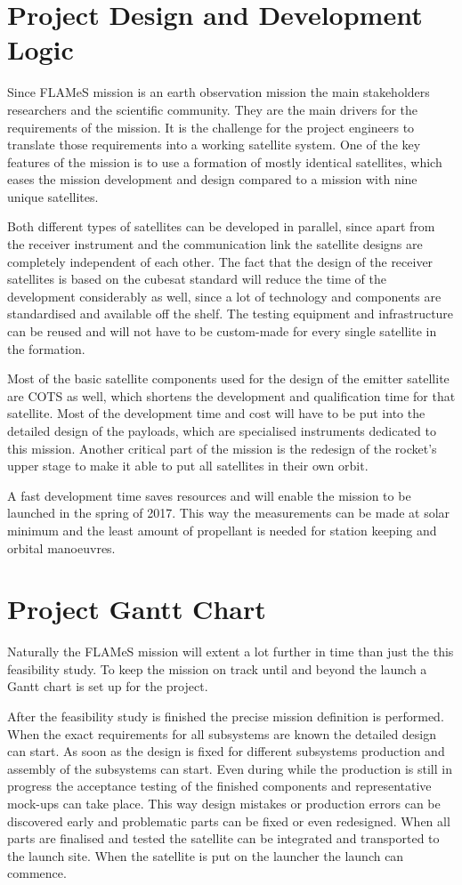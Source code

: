 \section{Project Design and Development Logic}
Since \ac{FLAMeS} mission is an earth observation mission the main stakeholders researchers and the scientific community. They are the main drivers for the requirements of the mission. It is the challenge for the project engineers to translate those requirements into a working satellite system. One of the key features of the mission is to use a formation of mostly identical satellites, which eases the mission development and design compared to a mission with nine unique satellites. 

Both different types of satellites can be developed in parallel, since apart from the receiver instrument and the communication link the satellite designs are completely independent of each other. The fact that the design of the receiver satellites is based on the cubesat standard will reduce the time of the development considerably as well, since a lot of technology and components are standardised and available off the shelf. The testing equipment and infrastructure can be reused and will not have to be custom-made for every single satellite in the formation. 

Most of the basic satellite components used for the design of the emitter satellite are \ac{COTS} as well, which shortens the development and qualification time for that satellite. Most of the development time and cost will have to be put into the detailed design of the payloads, which are specialised instruments dedicated to this mission. Another critical part of the mission is the redesign of the rocket's upper stage to make it able to put all satellites in their own orbit.

A fast development time saves resources and will enable the mission to be launched in the spring of 2017. This way the measurements can be made at solar minimum and the least amount of propellant is needed for station keeping and orbital manoeuvres.

\section{Project Gantt Chart}
Naturally the \ac{FLAMeS} mission will extent a lot further in time than just the this feasibility study. To keep the mission on track until and beyond the launch a Gantt chart is set up for the project.

After the feasibility study is finished the precise mission definition is performed. When the exact requirements for all subsystems are known the detailed design can start. As soon as the design is fixed for different subsystems production and assembly of the subsystems can start. Even during while the production is still in progress the acceptance testing of the finished components and representative mock-ups can take place. This way design mistakes or production errors can be discovered early and problematic parts can be fixed or even redesigned. When all parts are finalised and tested the satellite can be integrated and transported to the launch site. When the satellite is put on the launcher the launch can commence.

